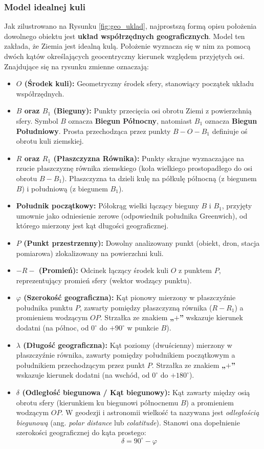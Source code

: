 \subsubsection{Model idealnej kuli}
Jak zilustrowano na Rysunku \ref{fig:geo_uklad}, najprostszą formą opisu położenia dowolnego obiektu jest \textbf{układ współrzędnych geograficznych}. Model ten zakłada, że Ziemia jest idealną kulą. Położenie wyznacza się w nim za pomocą dwóch kątów określających geocentryczny kierunek względem przyjętych osi. Znajdujące się na rysunku zmienne oznaczają:
\begin{itemize}
    \item \textbf{$O$ (Środek kuli):} Geometryczny środek sfery, stanowiący początek układu współrzędnych.
    \item \textbf{$B$ oraz $B_1$ (Bieguny):} Punkty przecięcia osi obrotu Ziemi z powierzchnią sfery. Symbol $B$ oznacza \textbf{Biegun Północny}, natomiast $B_1$ oznacza \textbf{Biegun Południowy}. Prosta przechodząca przez punkty $B-O-B_1$ definiuje oś obrotu kuli ziemskiej.
    \item \textbf{$R$ oraz $R_1$ (Płaszczyzna Równika):} Punkty skrajne wyznaczające na rzucie płaszczyznę równika ziemskiego (koła wielkiego prostopadłego do osi obrotu $B-B_1$). Płaszczyzna ta dzieli kulę na półkulę północną (z biegunem $B$) i południową (z biegunem $B_1$).
    \item \textbf{Południk początkowy:} Półokrąg wielki łączący bieguny $B$ i $B_1$, przyjęty umownie jako odniesienie zerowe (odpowiednik południka Greenwich), od którego mierzony jest kąt długości geograficznej.
    \item \textbf{$P$ (Punkt przestrzenny):} Dowolny analizowany punkt (obiekt, dron, stacja pomiarowa) zlokalizowany na powierzchni kuli.
    \item \textbf{$-R-$ (Promień):} Odcinek łączący środek kuli $O$ z punktem $P$, reprezentujący promień sfery (wektor wodzący punktu).
    \item \textbf{$\varphi$ (Szerokość geograficzna):} Kąt pionowy mierzony w płaszczyźnie południka punktu $P$, zawarty pomiędzy płaszczyzną równika ($R-R_1$) a promieniem wodzącym $OP$. Strzałka ze znakiem \textbf{„$+$”} wskazuje kierunek dodatni (na północ, od $0^\circ$ do $+90^\circ$ w punkcie $B$).
    \item \textbf{$\lambda$ (Długość geograficzna):} Kąt poziomy (dwuścienny) mierzony w płaszczyźnie równika, zawarty pomiędzy południkiem początkowym a południkiem przechodzącym przez punkt $P$. Strzałka ze znakiem \textbf{„$+$”} wskazuje kierunek dodatni (na wschód, od $0^\circ$ do $+180^\circ$).
    \item \textbf{$\delta$ (Odległość biegunowa / Kąt biegunowy):} Kąt zawarty między osią obrotu sfery (kierunkiem ku biegunowi północnemu $B$) a promieniem wodzącym $OP$. W geodezji i astronomii wielkość ta nazywana jest \textit{odległością biegunową} (ang. \textit{polar distance} lub \textit{colatitude}). Stanowi ona dopełnienie szerokości geograficznej do kąta prostego:
    \begin{equation*}
        \delta = 90^\circ - \varphi
    \end{equation*}
\end{itemize}
